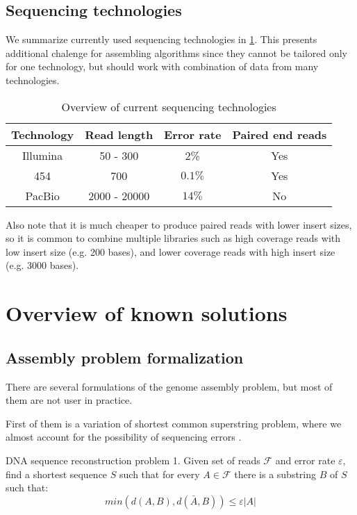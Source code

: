 \subsection{Sequencing technologies}

We summarize currently used sequencing technologies in \ref{tab:techs}.
This presents additional chalenge for assembling algorithms since they
cannot be tailored only for one technology, but should work with combination
of data from many technologies.

\begin{table}[h]
\centering
\begin{tabular}{|c|c|c|c|}
\hline
Technology & Read length & Error rate & Paired end reads \\\hline
Illumina & 50 - 300 & 2\% & Yes\\\hline
454 & 700 & $0.1\%$ & Yes \\\hline
PacBio & 2000 - 20000 & $14\%$ & No \\\hline
\end{tabular}
\caption{Overview of current sequencing technologies}
\label{tab:techs}
\end{table}

Also note that it is much cheaper to produce paired reads with lower insert sizes,
so it is common to combine multiple libraries such as high coverage reads with low insert size
(e.g. 200 bases), and lower coverage reads with high insert size (e.g. 3000 bases).

\section{Overview of known solutions}

\subsection{Assembly problem formalization}

There are several formulations of the genome assembly problem, but
most of them are not user in practice.

First of them is a variation of shortest common superstring problem, where we
almost account for the possibility of sequencing errors \cite{kececioglu1995combinatorial}. 

\begin{definition}{DNA sequence reconstruction problem 1.}
Given set of reads $\mathcal{F}$ and error rate $\varepsilon$, find
a shortest sequence $S$ such that for every $A \in \mathcal{F}$ there is a substring
$B$ of $S$ such that:
$$min(d(A,B), d(\bar{A}, B)) \leq \varepsilon |A|$$
\end{definition}

